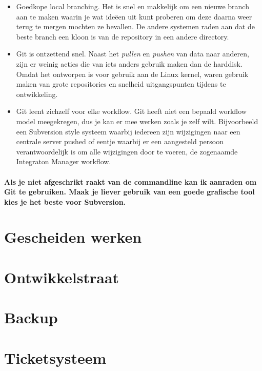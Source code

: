 \begin{itemize}
  \item Goedkope local branching. Het is snel en makkelijk om een nieuwe branch aan te maken waarin je wat ide\"{e}en uit kunt proberen om deze daarna weer terug te mergen mochten ze bevallen. De andere systemen raden aan dat de beste branch een kloon is van de repository in een andere directory.
  \item Git is ontzettend snel. Naast het \emph{pullen} en \emph{pushen} van data naar anderen, zijn er weinig acties die van iets anders gebruik maken dan de harddisk. Omdat het ontworpen is voor gebruik aan de Linux kernel, waren gebruik maken van grote repositories en snelheid uitgangspunten tijdens te ontwikkeling.
  \item Git leent zichzelf voor elke workflow. Git heeft niet een bepaald workflow model meegekregen, dus je kan er mee werken zoals je zelf wilt. Bijvoorbeeld een Subversion style systeem waarbij iedereen zijn wijzigingen naar een centrale server pushed of eentje waarbij er een aangesteld persoon verantwoordelijk is om alle wijzigingen door te voeren, de zogenaamde Integraton Manager workflow.
\end{itemize}

\paragraph{Als je niet afgeschrikt raakt van de commandline kan ik aanraden om Git te gebruiken. Maak je liever gebruik van een goede grafische tool kies je het beste voor Subversion.}

\section{Gescheiden werken}



\section{Ontwikkelstraat}



\section{Backup}



\section{Ticketsysteem}

